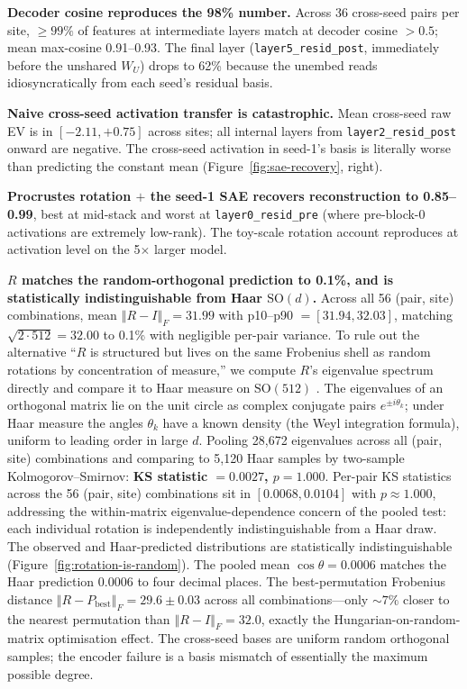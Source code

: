 \documentclass[11pt,letterpaper]{article}
\newcommand{\R}{R}
\newcommand{\frobnorm}[1]{\left\Vert #1 \right\Vert_F}
\begin{document}
\textbf{Decoder cosine reproduces the 98\% number.} Across 36 cross-seed pairs per site, $\geq 99\%$ of features at intermediate layers match at decoder cosine $> 0.5$; mean max-cosine 0.91--0.93. The final layer (\texttt{layer5\_resid\_post}, immediately before the unshared $W_U$) drops to 62\% because the unembed reads idiosyncratically from each seed's residual basis.

\textbf{Naive cross-seed activation transfer is catastrophic.} Mean cross-seed raw EV is in $[-2.11, +0.75]$ across sites; all internal layers from \texttt{layer2\_resid\_post} onward are negative. The cross-seed activation in seed-1's basis is literally worse than predicting the constant mean (Figure~\ref{fig:sae-recovery}, right).

\textbf{Procrustes rotation $+$ the seed-1 SAE recovers reconstruction to 0.85--0.99}, best at mid-stack and worst at \texttt{layer0\_resid\_pre} (where pre-block-0 activations are extremely low-rank). The toy-scale rotation account reproduces at activation level on the 5$\times$ larger model.

\textbf{$\R$ matches the random-orthogonal prediction to 0.1\%, and is statistically indistinguishable from Haar $\mathrm{SO}(d)$.} Across all 56 (pair, site) combinations, mean $\frobnorm{\R - I} = 31.99$ with p10--p90 $= [31.94, 32.03]$, matching $\sqrt{2 \cdot 512} = 32.00$ to 0.1\% with negligible per-pair variance. To rule out the alternative ``$\R$ is structured but lives on the same Frobenius shell as random rotations by concentration of measure,'' we compute $\R$'s eigenvalue spectrum directly and compare it to Haar measure on $\mathrm{SO}(512)$ \citep{mezzadri2007haar}. The eigenvalues of an orthogonal matrix lie on the unit circle as complex conjugate pairs $e^{\pm i \theta_k}$; under Haar measure the angles $\theta_k$ have a known density (the Weyl integration formula), uniform to leading order in large $d$. Pooling 28{,}672 eigenvalues across all (pair, site) combinations and comparing to 5{,}120 Haar samples by two-sample Kolmogorov--Smirnov: \textbf{KS statistic $= 0.0027$, $p = 1.000$}. Per-pair KS statistics across the 56 (pair, site) combinations sit in $[0.0068, 0.0104]$ with $p \approx 1.000$, addressing the within-matrix eigenvalue-dependence concern of the pooled test: each individual rotation is independently indistinguishable from a Haar draw. The observed and Haar-predicted distributions are statistically indistinguishable (Figure~\ref{fig:rotation-is-random}). The pooled mean $\cos\theta = 0.0006$ matches the Haar prediction $0.0006$ to four decimal places. The best-permutation Frobenius distance $\frobnorm{\R - P_{\mathrm{best}}} = 29.6 \pm 0.03$ across all combinations---only ${\sim}7\%$ closer to the nearest permutation than $\frobnorm{\R - I} = 32.0$, exactly the Hungarian-on-random-matrix optimisation effect. The cross-seed bases are uniform random orthogonal samples; the encoder failure is a basis mismatch of essentially the maximum possible degree.
\end{document}
